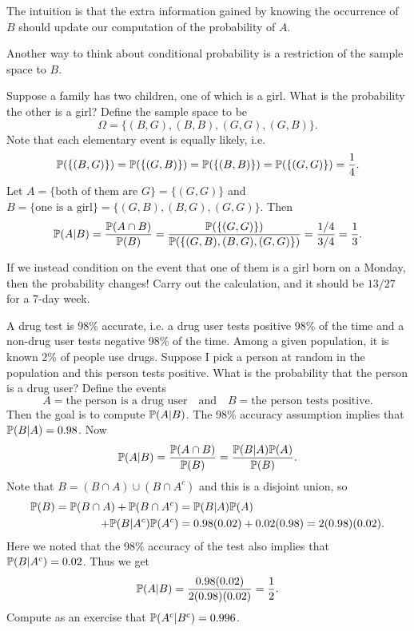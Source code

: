 \begin{remark}
  The intuition is that the extra information gained by
  knowing the occurrence of $B$ should update our
  computation of the probability of $A$.
\end{remark}

\begin{remark}
  Another way to think about conditional probability
  is a restriction of the sample space to $B$.
\end{remark}

\begin{example}
  Suppose a family has two children, one of
  which is a girl. What is the probability the other
  is a girl?
  Define the sample space to be
  \[
    \Omega = \{(B, G), (B, B), (G, G), (G, B)\}.
  \]
  Note that each elementary event is equally likely,
  i.e.
  \[
    \mathbb{P}(\{(B, G)\}) = \mathbb{P}(\{(G, B)\})
    = \mathbb{P}(\{(B, B)\}) = \mathbb{P}(\{(G, G)\}) = \frac{1}{4}.
  \]
  Let $A = \{\text{both of them are $G$}\} = \{(G, G)\}$
  and $B = \{\text{one is a girl}\} = \{(G, B), (B, G), (G, G)\}$.
  Then
  \[
    \mathbb{P}(A | B) = \frac{\mathbb{P}(A \cap B)}{\mathbb{P}(B)}
    = \frac{\mathbb{P}(\{(G, G)\})}{\mathbb{P}(\{(G, B), (B, G), (G, G)\})}
    = \frac{1/4}{3/4} = \frac{1}{3}.
  \]
\end{example}

\begin{remark}
  If we instead condition on the event that one of
  them is a girl born on a Monday, then the
  probability changes! Carry out the calculation,
  and it should be $13 / 27$ for a
  $7$-day week.
\end{remark}

\begin{example}
  A drug test is 98\% accurate, i.e.
  a drug user tests positive 98\% of the time
  and a non-drug user tests negative 98\% of the time.
  Among a given
  population, it is known 2\% of people use drugs.
  Suppose I pick a person at random in the population
  and this person tests positive. What is the
  probability that the person is a drug
  user? Define the events
  \[
    A = \text{the person is a drug user}
    \quad \text{and} \quad
    B = \text{the person tests positive}.
  \]
  Then the goal is to compute $\mathbb{P}(A | B)$. The
  98\% accuracy assumption implies that
  $\mathbb{P}(B | A) = 0.98$. Now
  \[
    \mathbb{P}(A | B) = \frac{\mathbb{P}(A \cap B)}{\mathbb{P}(B)}
    = \frac{\mathbb{P}(B | A) \mathbb{P}(A)}{\mathbb{P}(B)}.
  \]
  Note that $B = (B \cap A) \cup (B \cap A^c)$
  and this is a disjoint union, so
  \begin{align*}
    \mathbb{P}(B) = \mathbb{P}(B \cap A) + \mathbb{P}(B \cap A^c)
    &= \mathbb{P}(B | A) \mathbb{P}(A) \\
    + \mathbb{P}(B | A^c) \mathbb{P}(A^c)
    &= 0.98(0.02) + 0.02(0.98) = 2(0.98)(0.02).
  \end{align*}
  Here we noted that the 98\% accuracy of the test
  also implies that $\mathbb{P}(B | A^c) = 0.02$.
  Thus we get
  \[
    \mathbb{P}(A | B) = \frac{0.98(0.02)}{2(0.98)(0.02)}
    = \frac{1}{2}.
  \]
  Compute as an exercise that $\mathbb{P}(A^c | B^c) = 0.996$.
\end{example}

